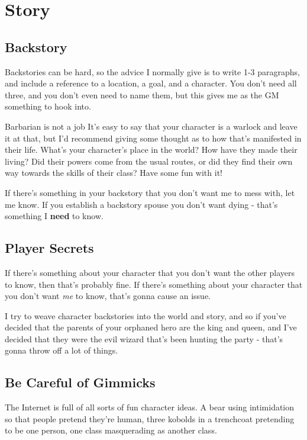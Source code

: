 \section {Story}

\subsection {Backstory}

Backstories can be hard, so the advice I normally give is to write 1-3 paragraphs, and include a reference to a location, a goal, and a character. You don't need all three, and you don't even need to name them, but this gives me as the GM something to hook into.

\begin{DndComment}{Barbarian is not a job}
  It's easy to say that your character is a warlock and leave it at that, but I'd recommend giving some thought as to how that's manifested in their life. What's your character's place in the world? How have they made their living? Did their powers come from the usual routes, or did they find their own way towards the skills of their class? Have some fun with it!
\end{DndComment}

If there's something in your backstory that you don't want me to mess with, let me know. If you establish a backstory spouse you don't want dying - that's something I \textbf{need} to know.

\subsection {Player Secrets}

If there's something about your character that you don't want the other players to know, then that's probably fine. If there's something about your character that you don't want \textit{me} to know, that's gonna cause an issue.

I try to weave character backstories into the world and story, and so if you've decided that the parents of your orphaned hero are the king and queen, and I've decided that they were the evil wizard that's been hunting the party - that's gonna throw off a lot of things.

\subsection {Be Careful of Gimmicks}

The Internet is full of all sorts of fun character ideas. A bear using intimidation so that people pretend they're human, three kobolds in a trenchcoat pretending to be one person, one class masquerading as another class.

